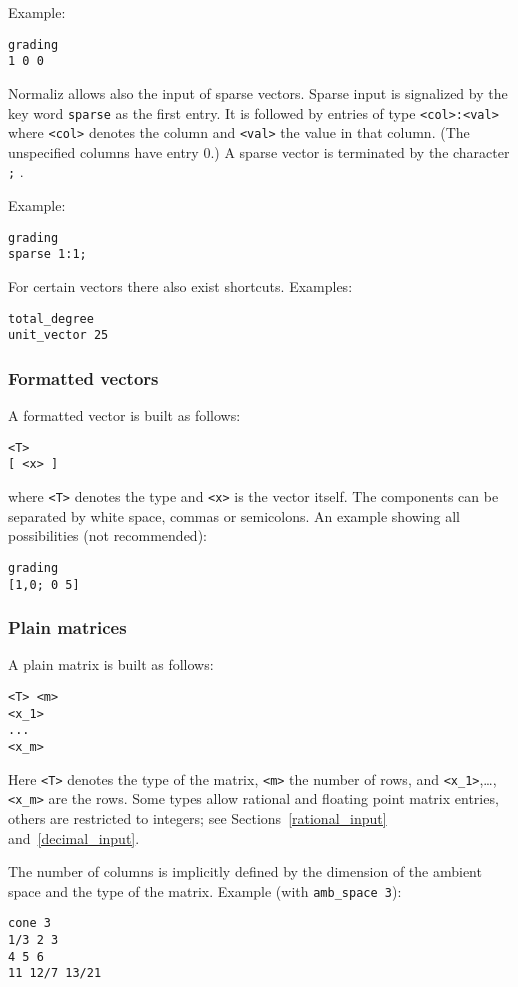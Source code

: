 \documentclass[12pt,a4paper]{scrartcl}
\theoremstyle{definition}
\def\ttt{\texttt}
\begin{document}
Example:
\begin{Verbatim}
grading
1 0 0
\end{Verbatim}

Normaliz allows also the input of sparse vectors. Sparse input is signalized by the key word \verb|sparse| as the first entry. It is followed by entries of type \verb|<col>:<val>| where \verb|<col>| denotes the column and \verb|<val>| the value in that column. (The unspecified columns have entry $0$.) A sparse vector is terminated by the character \verb|;| .

Example:
\begin{Verbatim}
grading
sparse 1:1;
\end{Verbatim}


For certain vectors there also exist shortcuts. Examples:
\begin{Verbatim}
total_degree
unit_vector 25
\end{Verbatim}


\subsubsection{Formatted vectors}

A formatted vector is built as follows:
\begin{Verbatim}
<T>
[ <x> ]
\end{Verbatim}
where \ttt{<T>} denotes the type and \ttt{<x>} is the vector itself. The components can be separated by white space, commas or semicolons. An example showing all possibilities (not recommended):
\begin{Verbatim}
grading
[1,0; 0 5]
\end{Verbatim}

\subsubsection{Plain matrices}

A plain matrix is built as follows:
\begin{Verbatim}
<T> <m>
<x_1>
...
<x_m>
\end{Verbatim}
Here \ttt{<T>} denotes the type of the matrix, \ttt{<m>} the number of rows, and \ttt{<x\_1>},\dots,\ttt{<x\_m>} are the rows. Some types allow rational and floating point matrix entries, others are restricted to integers; see Sections~\ref{rational_input} and~\ref{decimal_input}.

The number of columns is implicitly defined by the dimension of the ambient space and the type of the matrix. Example (with \verb|amb_space 3|):
\begin{Verbatim}
cone 3
1/3 2 3
4 5 6
11 12/7 13/21
\end{Verbatim}
\end{document}
